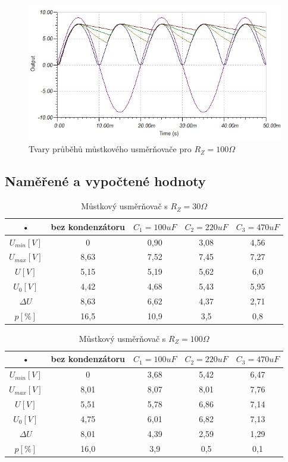 \documentclass[12pt]{article} %
\begin{document}
\begin{figure}[H]
\center
\includegraphics[scale=0.6]{mustkovy100.jpg}
\caption{Tvary průběhů můstkového usměrňovače pro $R_Z = 100\Omega$}
\end{figure}

\subsection{Naměřené a vypočtené hodnoty}
\begin{table}[H]
\center
\begin{tabular}{|c|c|c|c|c|}
\hline 
• & bez kondenzátoru & $C_1 = 100uF$ & $C_2 = 220uF$ & $C_3 = 470uF$ \\ 
\hline 
$U_{min} [V]$ & 0 & 0,90 & 3,08 & 4,56 \\ 
\hline 
$U_{max} [V]$ & 8,63 & 7,52 & 7,45 & 7,27 \\ 
\hline 
$U [V]$ & 5,15 & 5,19 & 5,62 & 6,0 \\ 
\hline 
$U_0 [V]$ & 4,42 & 4,68 & 5,43 & 5,95 \\ 
\hline 
$\Delta U$ & 8,63 & 6,62 & 4,37 & 2,71 \\ 
\hline 
$p [\%]$ & 16,5 & 10,9 & 3,5 & 0,8 \\ 
\hline 
\end{tabular}
\caption{Můstkový usměrňovač s $R_Z=30\Omega$}
\end{table}

\begin{table}[H]
\center
\begin{tabular}{|c|c|c|c|c|}
\hline 
• & bez kondenzátoru & $C_1 = 100uF$ & $C_2 = 220uF$ & $C_3 = 470uF$ \\ 
\hline 
$U_{min} [V]$ & 0 & 3,68 & 5,42 & 6,47 \\ 
\hline 
$U_{max} [V]$ & 8,01 & 8,07 & 8,01 & 7,76 \\ 
\hline 
$U [V]$ & 5,51 & 5,78 & 6,86 & 7,14 \\ 
\hline 
$U_0 [V]$ & 4,75 & 6,01 & 6,82 & 7,13 \\ 
\hline 
$\Delta U$ & 8,01 & 4,39 & 2,59 & 1,29 \\ 
\hline 
$p [\%]$ & 16,0 & 3,9 & 0,5 & 0,1 \\ 
\hline 
\end{tabular}
\caption{Můstkový usměrňovač s $R_Z=100\Omega$}
\end{table}
\end{document}
